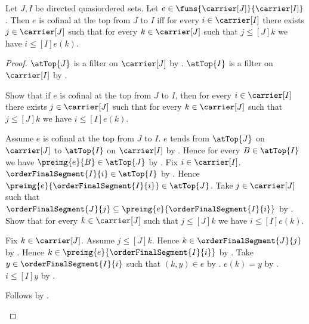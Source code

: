 \begin{theorem}\label{at_top_cofinal_iff_eventually_above}
    Let $J,I$ be directed quasiordered sets.
    Let $e\in\funs{\carrier[J]}{\carrier[I]}$.
    Then $e$ is cofinal at the top from $J$ to $I$ iff
        for every $i\in\carrier[I]$ there exists $j\in\carrier[J]$
        such that for every $k\in\carrier[J]$ such that
        $j\mathrel{\leq[J]}k$ we have
        $i\mathrel{\leq[I]}e(k)$.
\end{theorem}
\begin{proof}
    $\atTop{J}$ is a filter on $\carrier[J]$ by
        .
    $\atTop{I}$ is a filter on $\carrier[I]$ by
        .

    Show that if $e$ is cofinal at the top from $J$ to $I$, then
        for every $i\in\carrier[I]$ there exists $j\in\carrier[J]$
        such that for every $k\in\carrier[J]$ such that
        $j\mathrel{\leq[J]}k$ we have
        $i\mathrel{\leq[I]}e(k)$.
    \begin{subproof}
        Assume $e$ is cofinal at the top from $J$ to $I$.
        $e$ tends from $\atTop{J}$ on $\carrier[J]$ to
            $\atTop{I}$ on $\carrier[I]$ by .
        Hence for every $B\in\atTop{I}$ we have
            $\preimg{e}{B}\in\atTop{J}$ by
            .
        Fix $i\in\carrier[I]$.
        $\orderFinalSegment{I}{i}\in\atTop{I}$ by
            .
        Hence $\preimg{e}{\orderFinalSegment{I}{i}}\in\atTop{J}$.
        Take $j\in\carrier[J]$ such that
            $\orderFinalSegment{J}{j}\subseteq
                \preimg{e}{\orderFinalSegment{I}{i}}$ by
            .
        Show that for every $k\in\carrier[J]$ such that
            $j\mathrel{\leq[J]}k$ we have
            $i\mathrel{\leq[I]}e(k)$.
        \begin{subproof}
            Fix $k\in\carrier[J]$.
            Assume $j\mathrel{\leq[J]}k$.
            Hence $k\in\orderFinalSegment{J}{j}$ by
                .
            Hence $k\in\preimg{e}{\orderFinalSegment{I}{i}}$ by
                .
            Take $y\in\orderFinalSegment{I}{i}$ such that
                $(k,y)\in e$ by .
            $e(k)=y$ by .
            $i\mathrel{\leq[I]}y$ by
                .
        \end{subproof}
        Follows by \auto.
    \end{subproof}


\end{proof}
